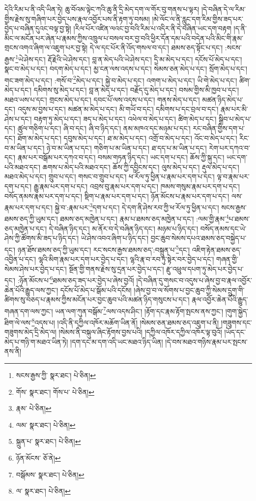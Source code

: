 དེའི་རིམ་པ་ནི་འདི་ཡིན་ཏེ། ཆུ་བོའམ་ལྟེང་ཀའི་ཆུ་ནི་དྲི་མེད་དག་ལ་གོར་བུ་གནས་པ་ལྟར། །དེ་བཞིན་དེ་ལ་རིམ་གྱིས་རྗེས་སུ་གཞིག་པར་བྱེད་པས་རྣལ་འབྱོར་པས་ནི་རྟག་ཏུ་བསམ། །མེ་ལོང་ལ་ནི་རླུང་དག་རིམ་གྱིས་ཟད་པར་བྱེད་པ་བཞིན་དུའང་བལྟ་བྱ་སྟེ། །རིལ་པོར་འཛིན་ལའང་བྱ་བའི་རིམ་པ་འདིར་ནི་དེ་བཞིན་ཡང་དག་བརྟག །ད་ནི་མིང་ལ་མངོན་པར་ཞེན་པ་རྣམས་ཀྱིས་འཁྲུལ་པ་བསལ་བར་བྱ་བའི་ཕྱིར་དོན་དམ་པའི་བདེན་པའི་མིང་གི་རྣམ་གྲངས་འགའ་ཞིག་ལ་འཇུག་པར་བྱ་སྟེ། དེ་ལ་དང་པོར་ནི་འོད་གསལ་བ་དང་། ཐམས་ཅད་སྟོང་པ་དང་། :སངས་རྒྱས་\footnote{སངས་རྒྱས་ཀྱི་  སྣར་ཐང་།  པེ་ཅིན། }ཡེ་ཤེས་དང་། རྡོ་རྗེའི་ཡེ་ཤེས་དང་། བླ་ན་མེད་པའི་ཡེ་ཤེས་དང་། དྲི་མ་མེད་པ་དང་། དངོས་པོ་མེད་པ་དང་། སྣང་བ་མེད་པ་དང་། བདག་མེད་པ་དང་། མྱ་ངན་ལས་འདས་པ་དང་། སེམས་ཅན་མེད་པ་དང་། སྲོག་མེད་པ་དང་། གང་ཟག་མེད་པ་དང་། :གསོ་བ་\footnote{གོས་  སྣར་ཐང་། གོས་པ་  པེ་ཅིན། }མེད་པ་དང་། སྐྱེ་བ་མེད་པ་དང་། འགག་པ་མེད་པ་དང་། ཡི་གེ་མེད་པ་དང་། ཚིག་མེད་པ་དང་། དམིགས་སུ་མེད་པ་དང་། བླ་ན་མེད་པ་དང་། བརྗོད་དུ་མེད་པ་དང་། བསམ་གྱིས་མི་ཁྱབ་པ་དང་། མཐའ་ཡས་པ་དང་། གྲངས་མེད་པ་དང་། དབང་པོ་ལས་འདས་པ་དང་། གནས་མེད་པ་དང་། མཚན་ཉིད་མེད་པ་དང་། འདུས་མ་བྱས་པ་དང་། མཚན་མ་མེད་པ་དང་། མི་གཡོ་བ་དང་། དམིགས་པ་དང་བྲལ་བ་དང་། རྣམ་པར་མི་ཤེས་པ་དང་། བརྟག་ཏུ་མེད་པ་དང་། ཟད་པ་མེད་པ་དང་། འཕེལ་བ་མེད་པ་དང་། ཚིག་མེད་པ་དང་། སྒྲིབ་པ་མེད་པ་དང་། ཚུལ་གཅིག་པ་དང་། ཞི་བ་དང་། ཞི་བ་ཉིད་དང་། ནམ་མཁའ་དང་མཉམ་པ་དང་། རང་བཞིན་གྱིས་དག་པ་དང་། ཐོག་མ་མེད་པ་དང་། དབུས་མེད་པ་དང་། ཐ་མ་མེད་པ་དང་། འགྲོ་བ་མེད་པ་དང་། འོང་བ་མེད་པ་དང་། རིང་བ་མ་ཡིན་པ་དང་། ཉེ་བ་མ་ཡིན་པ་དང་། གཅིག་པ་མ་ཡིན་པ་དང་། ཐ་དད་པ་མ་ཡིན་པ་དང་། རེག་པར་དཀའ་བ་དང་། རྣམ་པར་བསྒོམ་པར་དཀའ་བ་དང་། བསམ་གཏན་ཉིད་དང་། ཡང་དག་པ་དང་། ཆོས་ཀྱི་སྐུ་དང་། ཡང་དག་པའི་མཐའ་དང་། ཆགས་པ་མེད་པའི་མཐའ་དང་། ཆོས་ཀྱི་དབྱིངས་དང་། ལུས་མེད་པ་དང་། རྡུལ་མེད་པ་དང་། མཐའ་མེད་པ་དང་། གྲུབ་པ་དང་། གསང་བ་གྲུབ་པ་དང་། ཕ་རོལ་ཏུ་ཕྱིན་པ་རྣམ་པར་དག་པ་དང་། ལྟ་བ་རྣམ་པར་དག་པ་དང་། རྒྱུ་རྣམ་པར་དག་པ་དང་། འབྲས་བུ་རྣམ་པར་དག་པ་དང་། ཁམས་གསུམ་རྣམ་པར་དག་པ་དང་། བསོད་ནམས་རྣམ་པར་དག་པ་དང་། སྡིག་པ་རྣམ་པར་དག་པ་དང་། ཉོན་མོངས་པ་རྣམ་པར་དག་པ་དང་། ལས་རྣམ་པར་དག་པ་དང་། སྐྱེ་བ་:རྣམ་པར་\footnote{རྣམ་  པེ་ཅིན། }དག་པ་དང་། དེ་དག་ནི་ཤེས་རབ་ཀྱི་ཕ་རོལ་ཏུ་ཕྱིན་པ་དང་། སངས་རྒྱས་ཐམས་ཅད་ཀྱི་ཡུམ་དང་། ཐམས་ཅད་མཁྱེན་པ་དང་། རྣམ་པ་ཐམས་ཅད་མཁྱེན་པ་དང་། :ལམ་གྱི་རྣམ་\footnote{ལམ་  སྣར་ཐང་།  པེ་ཅིན། }པ་ཐམས་ཅད་མཁྱེན་པ་དང་། དེ་བཞིན་ཉིད་དང་། མ་ནོར་བ་དེ་བཞིན་ཉིད་དང་། མཉམ་པ་ཉིད་དང་། བསོད་ནམས་དང་ཡེ་ཤེས་ཀྱི་ཚོགས་མི་ཟད་པ་ཉིད་དང་། ཡེ་ཤེས་འབའ་ཞིག་པ་ཉིད་དང་། བྱང་ཆུབ་སེམས་དཔའ་ཐམས་ཅད་བསྐྱེད་པ་དང་། ཉན་ཐོས་ཐམས་ཅད་ཀྱི་ཡུམ་དང་། རང་སངས་རྒྱས་ཐམས་ཅད་:བསྐྲུན་པ་\footnote{སྐྲུན་པ་  སྣར་ཐང་།  པེ་ཅིན། }དང་། འཇིག་རྟེན་ཐམས་ཅད་འབྱིན་པ་དང་། ལྷའི་མིག་རྣམ་པར་དག་པར་བྱེད་པ་དང་། ལྷའི་རྣ་བ་རབ་ཏུ་སྟེར་བར་བྱེད་པ་དང་། གཞན་གྱི་སེམས་ཤེས་པར་བྱེད་པ་དང་། སྔོན་གྱི་གནས་རྗེས་སུ་དྲན་པར་བྱེད་པ་དང་། རྫུ་འཕྲུལ་དཔག་ཏུ་མེད་པར་བྱེད་པ་དང་། :ཉོན་མོངས་པ་\footnote{ཉོན་མོངས་  ཅོ་ནེ། }ཐམས་ཅད་ཟད་པར་བྱེད་པ་ཞེས་བྱའོ། །དེ་བཞིན་དུ་གསང་བ་འདུས་པ་ཞེས་བྱ་བ་རྣལ་འབྱོར་ཆེན་པོའི་རྒྱུད་ལས་ཀྱང་། དངོས་པོ་མེད་པ་སྒོམ་པའི་དངོས། །ཞེས་བྱ་བ་ལ་སོགས་པ་བྱང་ཆུབ་ཀྱི་སེམས་དྲུག་གི་ཚིགས་སུ་བཅད་པ་རྣམས་ཀྱིས་མངོན་པར་བྱང་ཆུབ་པའི་མཚན་ཉིད་གསུངས་པ་དང་། རྣལ་འབྱོར་ཆེན་པོའི་རྒྱུད་གཞན་དག་ལས་ཀྱང་། ཡན་ལག་ཀུན་བསྒོམ་\footnote{བསྒོམས་  སྣར་ཐང་།  པེ་ཅིན། }ལས་འདས་ཤིང་། །རྟོག་དང་རྣམ་རྟོག་སྤངས་ནས་ཀྱང་། །གུག་སྐྱེད་ཐིག་ལེ་ལས་\footnote{ལ་  སྣར་ཐང་།  པེ་ཅིན། }འདས་པ། །འདི་ནི་དཀྱིལ་འཁོར་མཆོག་ཡིན་ནོ། །སེམས་ཅན་ཐམས་ཅད་འཇུག་པ་ནི། །གཟུགས་དང་གཟུགས་མེད་དྲི་མེད་ལ། །སེམས་ནི་བསྐུལ་ཞིང་རྟོགས་བྱས་པའི། །དཀྱིལ་འཁོར་དཀྱིལ་འཁོར་ལྟ་བུའོ། །ཡོད་དང་མེད་པ་གཉི་ག་མཐའ་ཡིན་ཏེ། །དག་དང་མ་དག་འདི་ཡང་མཐའ་ཉིད་ཡིན། །དེ་བས་མཐའ་གཉིས་རྣམ་པར་སྤངས་ནས་ནི། 